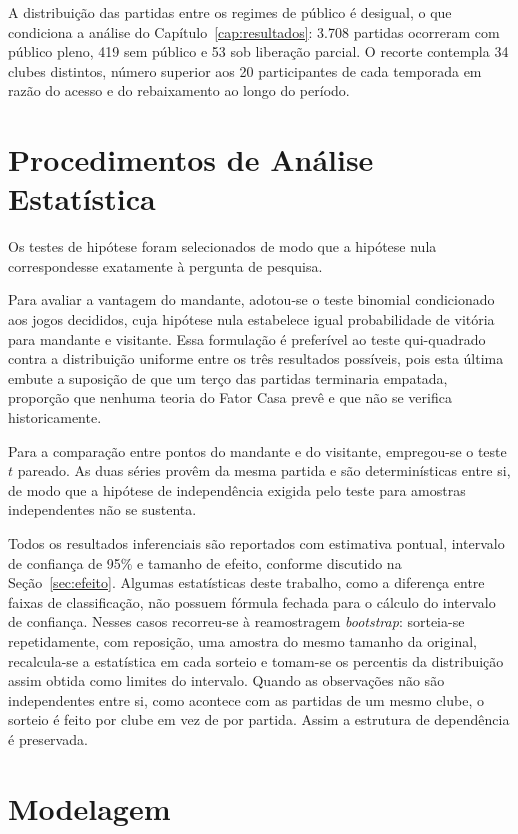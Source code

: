 A distribuição das partidas entre os regimes de público é desigual, o que
condiciona a análise do Capítulo~\ref{cap:resultados}: 3.708 partidas ocorreram
com público pleno, 419 sem público e 53 sob liberação parcial. O recorte
contempla 34 clubes distintos, número superior aos 20 participantes de cada
temporada em razão do acesso e do rebaixamento ao longo do período.

\section{Procedimentos de Análise Estatística}\label{sec:procedimentos}

Os testes de hipótese foram selecionados de modo que a hipótese nula correspondesse
exatamente à pergunta de pesquisa.

Para avaliar a vantagem do mandante, adotou-se o teste binomial condicionado aos
jogos decididos, cuja hipótese nula estabelece igual probabilidade de vitória para
mandante e visitante. Essa formulação é preferível ao teste qui-quadrado contra a
distribuição uniforme entre os três resultados possíveis, pois esta última embute
a suposição de que um terço das partidas terminaria empatada, proporção que
nenhuma teoria do Fator Casa prevê e que não se verifica historicamente.

Para a comparação entre pontos do mandante e do visitante, empregou-se o teste
$t$ pareado. As duas séries provêm da mesma partida e são determinísticas entre
si, de modo que a hipótese de independência exigida pelo teste para amostras
independentes não se sustenta.

Todos os resultados inferenciais são reportados com estimativa pontual, intervalo
de confiança de 95\% e tamanho de efeito, conforme discutido na
Seção~\ref{sec:efeito}. Algumas estatísticas deste trabalho, como a diferença entre faixas de
classificação, não possuem fórmula fechada para o cálculo do intervalo de
confiança. Nesses casos recorreu-se à reamostragem \textit{bootstrap}: sorteia-se
repetidamente, com reposição, uma amostra do mesmo tamanho da original,
recalcula-se a estatística em cada sorteio e tomam-se os percentis da
distribuição assim obtida como limites do intervalo. Quando as observações não
são independentes entre si, como acontece com as partidas de um mesmo clube, o
sorteio é feito por clube em vez de por partida. Assim a estrutura de
dependência é preservada.

\section{Modelagem}\label{sec:modelagem}

